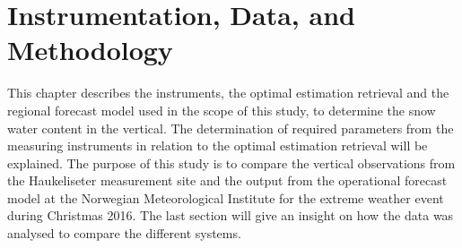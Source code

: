 \chapter{Instrumentation, Data, and Methodology}\label{ch:Methods}
This chapter describes the instruments, the optimal estimation retrieval and the regional forecast model used in the scope of this study, to determine the snow water content in the vertical. The determination of required parameters from the measuring instruments in relation to the optimal estimation retrieval will be explained. The purpose of this study is to compare the vertical observations from the Haukeliseter measurement site and the output from the operational forecast model at the Norwegian Meteorological Institute for the extreme weather event during Christmas 2016. 
The last section will give an insight on how the data was analysed to compare the different systems. 







